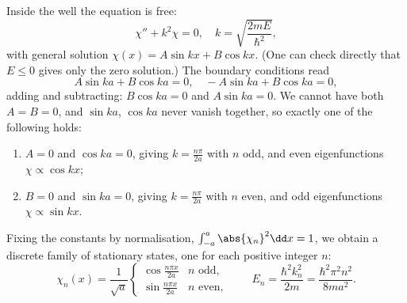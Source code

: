 Inside the well the equation is free:
$$
\chi'' + k^2 \chi = 0, \quad k = \sqrt{\frac{2mE}{\hbar^2}},
$$
with general solution $\chi(x) = A \sin kx + B \cos kx$. (One can check directly that $E \leq 0$ gives only the zero solution.) The boundary conditions read
$$
A \sin ka + B \cos ka = 0, \quad -A \sin ka + B \cos ka = 0,
$$
adding and subtracting: $B \cos ka = 0$ and $A \sin ka = 0$. We cannot have both $A = B = 0$, and $\sin ka$, $\cos ka$ never vanish together, so exactly one of the following holds:
\begin{enumerate}[label=(\roman*)]
    \item $A = 0$ and $\cos ka = 0$, giving $k = \frac{n \pi}{2a}$ with $n$ odd, and even eigenfunctions $\chi \propto \cos kx$;
    \item $B = 0$ and $\sin ka = 0$, giving $k = \frac{n \pi}{2a}$ with $n$ even, and odd eigenfunctions $\chi \propto \sin kx$.
\end{enumerate}
Fixing the constants by normalisation, $\int_{-a}^{a} \abs{\chi_n}^2 \dd x = 1$, we obtain a discrete family of stationary states, one for each positive integer $n$:
$$
\chi_n(x) = \frac{1}{\sqrt{a}} \begin{cases}
    \cos \frac{n \pi x}{2a} & n \text{ odd}, \\[2pt]
    \sin \frac{n \pi x}{2a} & n \text{ even},
\end{cases}
\qquad
E_n = \frac{\hbar^2 k_n^2}{2m} = \frac{\hbar^2 \pi^2 n^2}{8 m a^2}.
$$

\begin{center}
\end{center}

